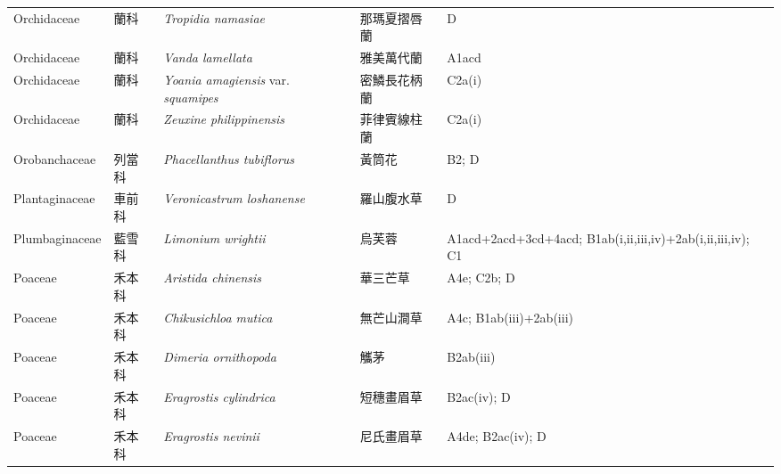 {\begin{longtable}{p{2.5cm}p{2.5cm}p{4.5cm}p{2.5cm}p{3cm}}
    Orchidaceae & 蘭科 & \textit{Tropidia namasiae}  & 那瑪夏摺唇蘭 & D \index{Tropidia@\textit{Tropidia}!namasiae@\textit{namasiae}}  \index{那瑪夏摺唇蘭} \\
    Orchidaceae & 蘭科 & \textit{Vanda lamellata}  & 雅美萬代蘭 & A1acd \index{Vanda@\textit{Vanda}!lamellata@\textit{lamellata}}  \index{雅美萬代蘭} \\
    Orchidaceae & 蘭科 & \textit{Yoania amagiensis} var. \textit{squamipes}  & 密鱗長花柄蘭 & C2a(i) \index{Yoania@\textit{Yoania}!amagiensis@\textit{amagiensis}!var. squamipes@var. \textit{squamipes}}  \index{密鱗長花柄蘭} \\
    Orchidaceae & 蘭科 & \textit{Zeuxine philippinensis}  & 菲律賓線柱蘭 & C2a(i) \index{Zeuxine@\textit{Zeuxine}!philippinensis@\textit{philippinensis}}  \index{菲律賓線柱蘭} \\
    Orobanchaceae & 列當科 & \textit{Phacellanthus tubiflorus}  & 黃筒花 & B2; D \index{Phacellanthus@\textit{Phacellanthus}!tubiflorus@\textit{tubiflorus}}  \index{黃筒花} \\
    Plantaginaceae & 車前科 & \textit{Veronicastrum loshanense}  & 羅山腹水草 & D \index{Veronicastrum@\textit{Veronicastrum}!loshanense@\textit{loshanense}}  \index{羅山腹水草} \\
    Plumbaginaceae & 藍雪科 & \textit{Limonium wrightii}  & 烏芙蓉 & A1acd+2acd+3cd+4acd; B1ab(i,ii,iii,iv)+2ab(i,ii,iii,iv); C1 \index{Limonium@\textit{Limonium}!wrightii@\textit{wrightii}}  \index{烏芙蓉} \\
    Poaceae & 禾本科 & \textit{Aristida chinensis}  & 華三芒草 & A4e; C2b; D \index{Aristida@\textit{Aristida}!chinensis@\textit{chinensis}}  \index{華三芒草} \\
    Poaceae & 禾本科 & \textit{Chikusichloa mutica}  & 無芒山澗草 & A4c; B1ab(iii)+2ab(iii) \index{Chikusichloa@\textit{Chikusichloa}!mutica@\textit{mutica}}  \index{無芒山澗草} \\
    Poaceae & 禾本科 & \textit{Dimeria ornithopoda}  & 觿茅 & B2ab(iii) \index{Dimeria@\textit{Dimeria}!ornithopoda@\textit{ornithopoda}}  \index{觿茅} \\
    Poaceae & 禾本科 & \textit{Eragrostis cylindrica}  & 短穗畫眉草 & B2ac(iv); D \index{Eragrostis@\textit{Eragrostis}!cylindrica@\textit{cylindrica}}  \index{短穗畫眉草} \\
    Poaceae & 禾本科 & \textit{Eragrostis nevinii}  & 尼氏畫眉草 & A4de; B2ac(iv); D \index{Eragrostis@\textit{Eragrostis}!nevinii@\textit{nevinii}}  \index{尼氏畫眉草} \\

\end{longtable}}
